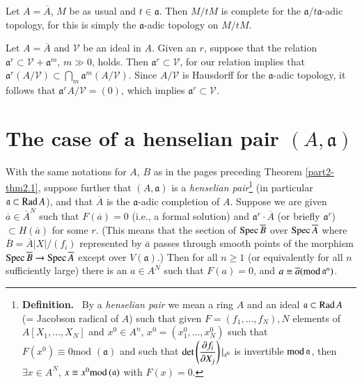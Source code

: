 Let $A=\overline{A}$, $M$ be as usual and $t\in \mathfrak{a}$. Then
$M/tM$ is complete for the $\mathfrak{a}/t\mathfrak{a}$-adic topology,
for this is simply the $\mathfrak{a}$-adic topology on $M/tM$.

Let $A=\overline{A}$ and $\mathcal{V}$ be an ideal in $A$. Given an
$r$, suppose that the relation $\mathfrak{a}^{r}\subset
\mathcal{V}+\mathfrak{a}^{m}$, $m\gg 0$, holds. Then
$\mathfrak{a}^{r}\subset \mathcal{V}$, for our relation implies
that\pageoriginale
$\mathfrak{a}^{r}(A/\mathcal{V})\subset\bigcap\limits_{m}\mathfrak{a}^{m}(A/\mathcal{V})$. Since
$A/\mathcal{V}$ is Hausdorff for the $\mathfrak{a}$-adic topology, it
follows that $\mathfrak{a}^{r}A/\mathcal{V}=(0)$, which implies
$\mathfrak{a}^{r}\subset \mathcal{V}$. 

\section{The case of a henselian pair
  $(A,\mathfrak{a})$}\label{part2-sec3}

\begin{theorem}\label{part2-thm3.1}
With the same notations for $A$, $B$ as in the pages preceding Theorem
\ref{part2-thm2.1}, suppose further that $(A,\mathfrak{a})$ is a {\em
  henselian pair}\footnote[1]{{\bf Definition.}~ By a {\em henselian
    pair} we mean a ring $A$ and an ideal $\mathfrak{a}\subset \operatorname{Rad} A$
(= Jacobson radical of $A$) such that given $F=(f_{1},\ldots,f_{N}),N$
elements of $A[X_{1},\ldots,X_{N}]$ and $x^{0}\in A^{n}$,
$x^{0}=(x^{0}_{1},\ldots,x^{0}_{N})$ such that $F(x^{0})\equiv
0\text{mod~}(\mathfrak{a})$ and such that $\det\left(\dfrac{\partial
  f_{i}}{\partial X_{j}}\right)|_{x^{0}}$ is invertible
$\text{mod\,}\mathfrak{a}$, then $\exists x\in A^{N}$, $x\equiv
x^{0}\text{mod\,}(\mathfrak{a})$ with $F(x)=0$.} (in particular
$\mathfrak{a}\subset \operatorname{Rad} A$), and that $\overline{A}$ is the
$\mathfrak{a}$-adic completion of $A$. Suppose we are given
$\overline{a}\in \overline{A}^{N}$ such that $F(\overline{a})=0$
(i.e., a formal solution) and $\mathfrak{a}^{r}\cdot \overline{A}$ (or
briefly $\mathfrak{a}^{r}$) $\subset H(\overline{a})$ for some
$r$. (This means that the section of $\operatorname{Spec} \overline{B}$ over $\operatorname{Spec}
\overline{A}$ where $\overline{B}=\overline{A}|X|/(f_{i})$ represented
by $\overline{a}$ passes through smooth points of the morphism $\operatorname{Spec}
\overline{B}\to \operatorname{Spec} \overline{A}$ except over $V(\mathfrak{a})$.)
Then for all $n\geq 1$ (or equivalently for all $n$ sufficiently
large) there is an $a\in A^{N}$ such that $F(a)=0$, and $a\equiv
\overline{a}(\text{mod\,}\mathfrak{a}^{n})$. 
\end{theorem}


